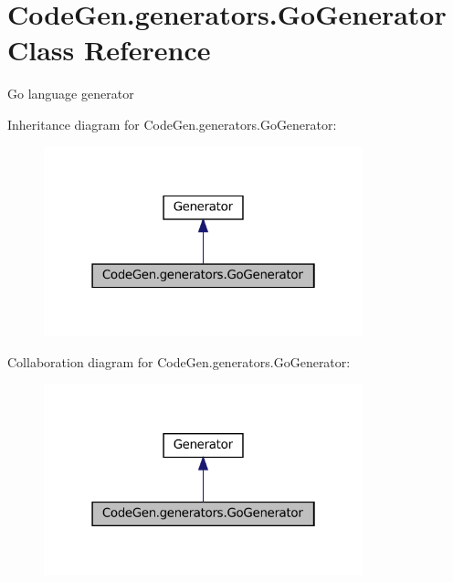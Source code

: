 \hypertarget{classCodeGen_1_1generators_1_1GoGenerator}{}\section{Code\+Gen.\+generators.\+Go\+Generator Class Reference}
\label{classCodeGen_1_1generators_1_1GoGenerator}


Go language generator  




Inheritance diagram for Code\+Gen.\+generators.\+Go\+Generator\+:
\nopagebreak
\begin{figure}[H]
\begin{center}
\leavevmode
\includegraphics[width=262pt]{classCodeGen_1_1generators_1_1GoGenerator__inherit__graph}
\end{center}
\end{figure}


Collaboration diagram for Code\+Gen.\+generators.\+Go\+Generator\+:
\nopagebreak
\begin{figure}[H]
\begin{center}
\leavevmode
\includegraphics[width=262pt]{classCodeGen_1_1generators_1_1GoGenerator__coll__graph}
\end{center}
\end{figure}
